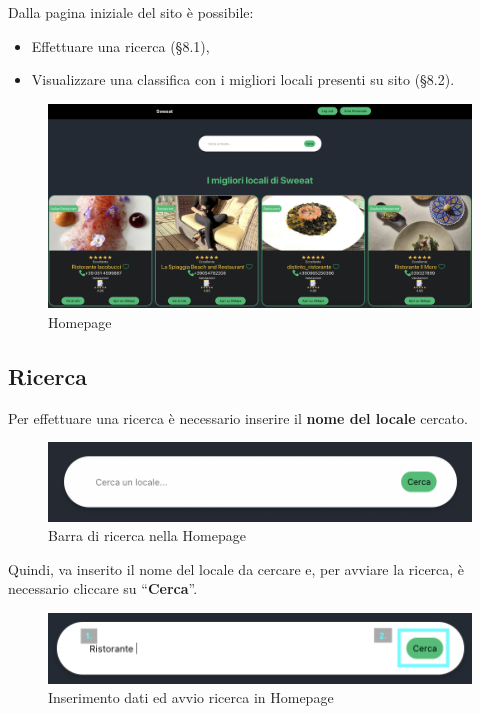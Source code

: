 Dalla pagina iniziale del sito è possibile:

\begin{itemize}
\item Effettuare una ricerca (\S{8.1}),
\item Visualizzare una classifica con i migliori locali presenti su sito (\S{8.2}).  
\end{itemize}

\begin{figure}[H]
\centering
\includegraphics[scale=0.3]{./images/Homepage/Homepage.png} 
\caption{Homepage}
\end{figure}

\subsection{Ricerca}

Per effettuare una ricerca è necessario inserire il \textbf{nome del locale} cercato.

\begin{figure}[H]
\centering
\includegraphics[scale=0.45]{./images/Homepage/Ricerca.png} 
\caption{Barra di ricerca nella Homepage}
\end{figure}

Quindi, va inserito il nome del locale da cercare e, per avviare la ricerca, è necessario cliccare su “\textbf{Cerca}”.

\begin{figure}[H]
\centering
\includegraphics[scale=0.5]{./images/Homepage/Ricerca2.png} 
\caption{Inserimento dati ed avvio ricerca in Homepage}
\end{figure}

